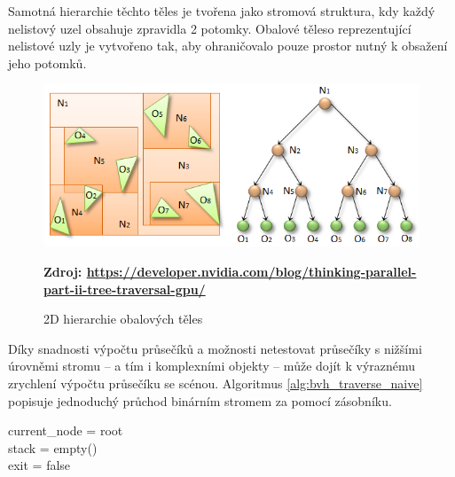 Samotná hierarchie těchto těles je tvořena jako stromová struktura, kdy každý nelistový uzel obsahuje zpravidla 2 potomky. Obalové těleso reprezentující nelistové uzly je vytvořeno tak, aby ohraničovalo pouze prostor nutný k obsažení jeho potomků.

\begin{figure}[H]
	\centering
	\includegraphics[scale=0.5]{images/fig03-bvh.png}
	\caption{2D hierarchie obalových těles}
	\textbf{Zdroj: \url{https://developer.nvidia.com/blog/thinking-parallel-part-ii-tree-traversal-gpu/}}
	\label{fig:slabs}
\end{figure}

Díky snadnosti výpočtu průsečíků a možnosti netestovat průsečíky s nižšími úrovněmi stromu -- a tím i komplexními objekty -- může dojít k výraznému zrychlení výpočtu průsečíku se scénou. Algoritmus \ref{alg:bvh_traverse_naive} popisuje jednoduchý průchod binárním stromem za pomocí zásobníku.

\begin{center}
	\begin{czechalgorithm}[H] \label{alg:bvh_traverse_naive}
		current\_node = root\\
		stack = empty()\\
		exit = false\\
		 {\\
		}\\
		\caption{Průchod BVH stromem pro ray tracing \cite{Vaidyanathan2019WideBT}}
	\end{czechalgorithm}
\end{center}



